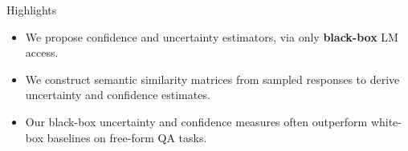 
\begin{alertblock}{Highlights}

\begin{itemize}
\item We propose confidence and uncertainty estimators, via only \textbf{black-box} LM 
 access.

\item 
We construct semantic similarity matrices from sampled responses to derive uncertainty and confidence estimates.

\item %
Our black-box uncertainty and confidence measures often outperform white-box baselines on free-form QA tasks.

\end{itemize}

\end{alertblock}







